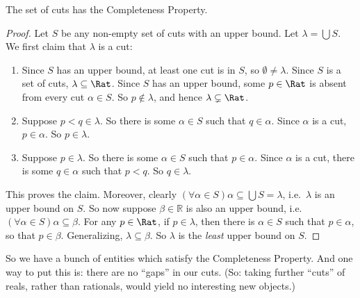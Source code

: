 \documentclass[../../../include/open-logic-section]{subfiles}
\begin{document}
\begin{thm}
The set of cuts has the Completeness Property. 
\end{thm}

\begin{proof}
Let $S$ be any non-empty set of cuts with an upper bound. Let $\lambda
= \bigcup S$. 
We first claim that $\lambda$ is a cut:
\begin{enumerate}
\item Since $S$ has an upper bound, at least one cut is in $S$, so
$\emptyset \neq \lambda$. Since $S$ is a set of cuts, $\lambda
\subseteq \Rat$. Since $S$ has an upper bound, some $p \in \Rat$ is
absent from every cut $\alpha \in S$. So $p\notin \lambda$, and hence
$\lambda \subsetneq \Rat$.
\item Suppose $p < q \in \lambda$. So there is some $\alpha \in S$
such that $q \in \alpha$. Since $\alpha$ is a cut, $p \in \alpha$. So
$p \in \lambda$.
\item Suppose $p \in \lambda$. So there is some $\alpha \in S$ such
that $p \in \alpha$. Since $\alpha$ is a cut, there is some $q \in
\alpha$ such that $p < q$. So $q \in \lambda$. 
\end{enumerate}
This proves the claim. Moreover, clearly $(\forall \alpha \in S)\alpha
\subseteq \bigcup S = \lambda$, i.e.\ $\lambda$ is an upper bound on $S$. So now suppose $\beta \in \mathbb{R}$ is also an upper bound, i.e.\ $(\forall \alpha \in S)\alpha \subseteq \beta$. For any $p \in \Rat$, if $p \in \lambda$, then there is $\alpha \in S$ such that $p \in \alpha$, so that $p \in \beta$. Generalizing, $\lambda \subseteq \beta$. So $\lambda$ is the \emph{least} upper bound on $S$.
\end{proof}

So we have a bunch of entities which satisfy the Completeness
Property. And one way to put this is: there are no ``gaps'' in our
cuts. (So: taking further ``cuts'' of reals, rather than rationals,
would yield no interesting new objects.)
\end{document}
